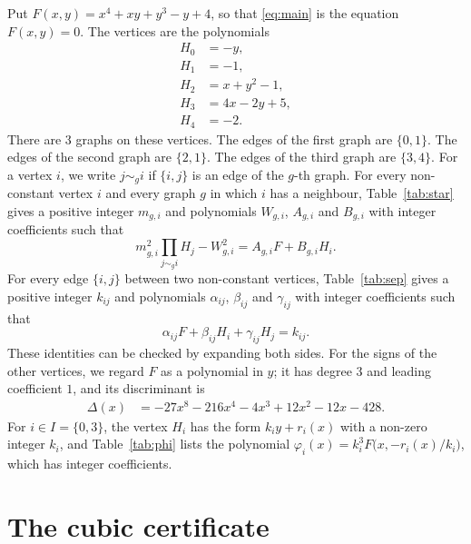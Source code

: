 \documentclass[11pt]{article}
\begin{document}
Put $F(x,y)=x^{4}+xy+y^{3}-y+4$, so that \eqref{eq:main} is the equation $F(x,y)=0$. The vertices are the polynomials
\begin{align*}
H_{0}&=-y,\\
H_{1}&=-1,\\
H_{2}&=x+y^{2}-1,\\
H_{3}&=4x-2y+5,\\
H_{4}&=-2.
\end{align*}
There are 3 graphs on these vertices. The edges of the first graph are $\{0,1\}$. The edges of the second graph are $\{2,1\}$. The edges of the third graph are $\{3,4\}$. For a vertex $i$, we write $j\sim_g i$ if $\{i,j\}$ is an edge of the $g$-th graph.
For every non-constant vertex $i$ and every graph $g$ in which $i$ has a neighbour, Table~\ref{tab:star} gives a positive integer $m_{g,i}$ and polynomials $W_{g,i}$, $A_{g,i}$ and $B_{g,i}$ with integer coefficients such that
\begin{equation}\label{eq:star}
m_{g,i}^2\prod_{j\sim_g i}H_j-W_{g,i}^2=A_{g,i}F+B_{g,i}H_i.
\end{equation}
For every edge $\{i,j\}$ between two non-constant vertices, Table~\ref{tab:sep} gives a positive integer $k_{ij}$ and polynomials $\alpha_{ij}$, $\beta_{ij}$ and $\gamma_{ij}$ with integer coefficients such that
\begin{equation}\label{eq:sep}
\alpha_{ij}F+\beta_{ij}H_i+\gamma_{ij}H_j=k_{ij}.
\end{equation}
These identities can be checked by expanding both sides.
For the signs of the other vertices, we regard $F$ as a polynomial in $y$; it has degree $3$ and leading coefficient $1$, and its discriminant is
\begin{align*}
\Delta(x)&=-27x^{8}-216x^{4}-4x^{3}+12x^{2}-12x-428.
\end{align*}
For $i\in I=\{0,\allowbreak 3\}$, the vertex $H_i$ has the form $k_iy+r_i(x)$ with a non-zero integer $k_i$, and Table~\ref{tab:phi} lists the polynomial $\varphi_i(x)=k_i^3F\bigl(x,-r_i(x)/k_i\bigr)$, which has integer coefficients.

\section{The cubic certificate}
\end{document}
